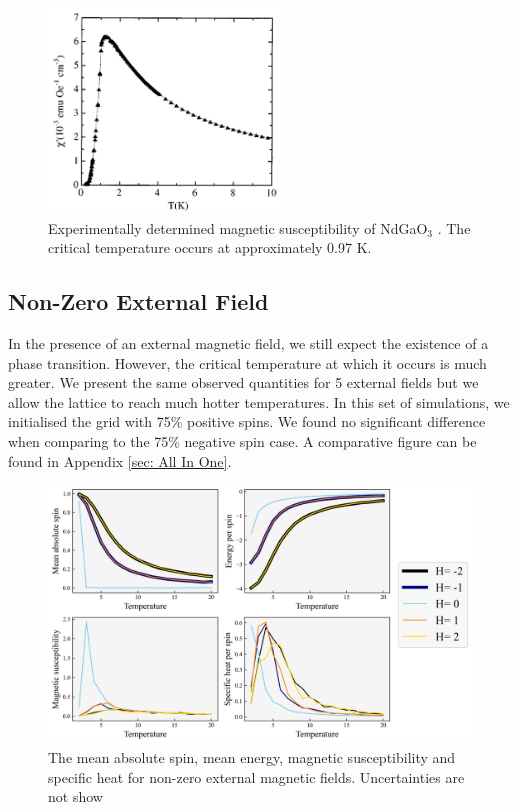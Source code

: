 \documentclass{IAYCPro}
\begin{document}
\begin{figure}[H]
    \centering
    \includegraphics[width=0.55\textwidth]{figs/Mag-SUS.png}
    \caption{Experimentally determined magnetic susceptibility of NdGaO$_{3}$ \cite{magsus}. The critical temperature occurs at approximately 0.97 K.}
    \label{fig:sus}
\end{figure}

\raggedbottom
\newpage

\subsection{Non-Zero External Field}
In the presence of an external magnetic field, we still expect the existence of a phase transition. However, the critical temperature at which it occurs is much greater. We present the same observed quantities for 5 external fields but we allow the lattice to reach much hotter temperatures. In this set of simulations, we initialised the grid with 75\% positive spins. We found no significant difference when comparing to the 75\% negative spin case. A comparative figure can be found in Appendix \ref{sec: All In One}.

\begin{figure}[H]
    \centering
    \includegraphics[width=1\textwidth]{figs/hall.png}
    \caption{The mean absolute spin, mean energy, magnetic susceptibility and specific heat for non-zero external magnetic fields. Uncertainties are not show}
    \label{fig:nonzero}
\end{figure}
\end{document}
